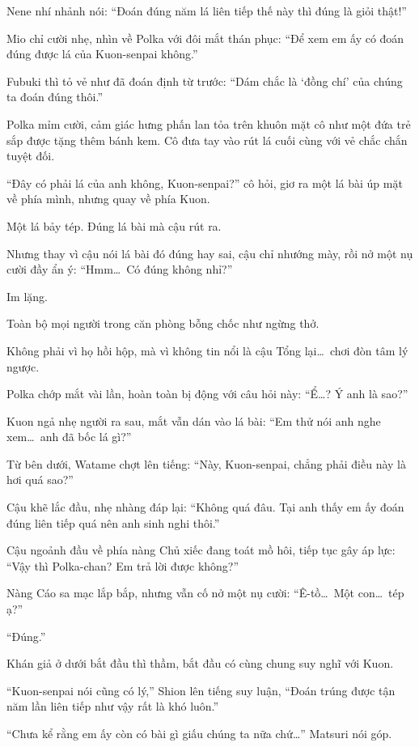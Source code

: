 \documentclass[../main.tex]{subfiles}
\begin{document}
Nene nhí nhảnh nói: ``Đoán đúng năm lá liên tiếp thế này thì đúng là giỏi thật!''

Mio chỉ cười nhẹ, nhìn về Polka với đôi mắt thán phục: ``Để xem em ấy có đoán đúng được lá của Kuon-senpai không.''

Fubuki thì tỏ vẻ như đã đoán định từ trước: ``Dám chắc là `đồng chí' của chúng ta đoán đúng thôi.''

Polka mỉm cười, cảm giác hưng phấn lan tỏa trên khuôn mặt cô như một đứa trẻ sắp được tặng thêm bánh kem. Cô đưa tay vào rút lá cuối cùng với vẻ chắc chắn tuyệt đối.

``Đây có phải lá của anh không, Kuon-senpai?'' cô hỏi, giơ ra một lá bài úp mặt về phía mình, nhưng quay về phía Kuon.

Một lá bảy tép. Đúng lá bài mà cậu rút ra.

Nhưng thay vì cậu nói lá bài đó đúng hay sai, cậu chỉ nhướng mày, rồi nở một nụ cười đầy ẩn ý: ``Hmm\dots\ Có đúng không nhỉ?''

Im lặng.

Toàn bộ mọi người trong căn phòng bỗng chốc như ngừng thở.

Không phải vì họ hồi hộp, mà vì không tin nổi là cậu Tổng lại\dots\ chơi đòn tâm lý ngược.

Polka chớp mắt vài lần, hoàn toàn bị động với câu hỏi này: ``Ể\dots? Ý anh là sao?''

Kuon ngả nhẹ người ra sau, mắt vẫn dán vào lá bài: ``Em thử nói anh nghe xem\dots\ anh đã bốc lá gì?''

Từ bên dưới, Watame chợt lên tiếng: ``Này, Kuon-senpai, chẳng phải điều này là hơi quá sao?''

Cậu khẽ lắc đầu, nhẹ nhàng đáp lại: ``Không quá đâu. Tại anh thấy em ấy đoán đúng liên tiếp quá nên anh sinh nghi thôi.''

Cậu ngoảnh đầu về phía nàng Chủ xiếc đang toát mồ hôi, tiếp tục gây áp lực: ``Vậy thì Polka-chan? Em trả lời được không?''

Nàng Cáo sa mạc lắp bắp, nhưng vẫn cố nở một nụ cười: ``Ê-tồ\dots\ Một con\dots\ tép ạ?''

``Đúng.''

Khán giả ở dưới bắt đầu thì thầm, bắt đầu có cùng chung suy nghĩ với Kuon.

``Kuon-senpai nói cũng có lý,'' Shion lên tiếng suy luận, ``Đoán trúng được tận năm lần liên tiếp như vậy rất là khó luôn.''

``Chưa kể rằng em ấy còn có bài gì giấu chúng ta nữa chứ\dots'' Matsuri nói góp.
\end{document}
